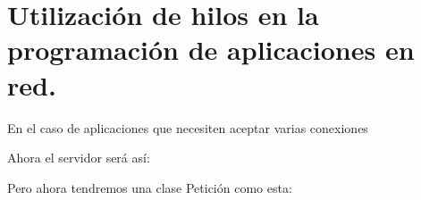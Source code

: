 \documentclass[letterpaper,10pt,spanish]{sphinxmanual}
\begin{document}
\section{Utilización de hilos en la programación de aplicaciones en red.}
\label{\detokenize{textos/tema3:utilizacion-de-hilos-en-la-programacion-de-aplicaciones-en-red}}
En el caso de aplicaciones que necesiten aceptar varias conexiones 

Ahora el servidor será así:

\begin{sphinxVerbatim}[commandchars=\\\{\}]
 
         
          
          
\end{sphinxVerbatim}

Pero ahora tendremos una clase Petición como esta:
\end{document}
